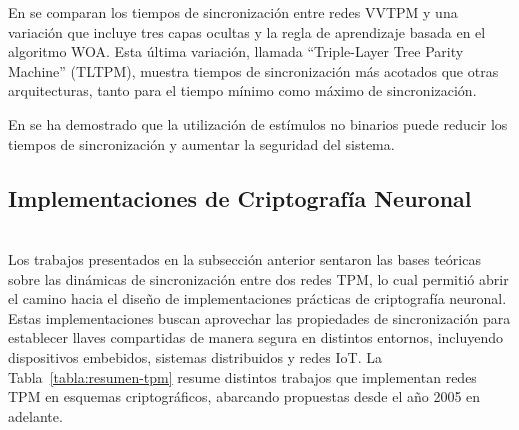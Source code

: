 En \cite{sarkarChaosBasedMutualSynchronization2021} se comparan los tiempos de sincronización entre redes VVTPM y una variación que incluye tres capas ocultas y la regla de aprendizaje basada en el algoritmo WOA. Esta última variación, llamada “Triple-Layer Tree Parity Machine” (TLTPM), muestra tiempos de sincronización más acotados que otras arquitecturas, tanto para el tiempo mínimo como máximo de sincronización.

En \cite{stypinskiSynchronizationTreeParity2022} se ha demostrado que la utilización de estímulos no binarios puede reducir los tiempos de sincronización y aumentar la seguridad del sistema.

\subsection{Implementaciones de Criptografía Neuronal}
\hfil \\
Los trabajos presentados en la subsección anterior sentaron las bases teóricas sobre las dinámicas de sincronización entre dos redes TPM, lo cual permitió abrir el camino hacia el diseño de implementaciones prácticas de criptografía neuronal. Estas implementaciones buscan aprovechar las propiedades de sincronización para establecer llaves compartidas de manera segura en distintos entornos, incluyendo dispositivos embebidos, sistemas distribuidos y redes IoT. La Tabla~\ref{tabla:resumen-tpm} resume distintos trabajos que implementan redes TPM en esquemas criptográficos, abarcando propuestas desde el año 2005 en adelante.
